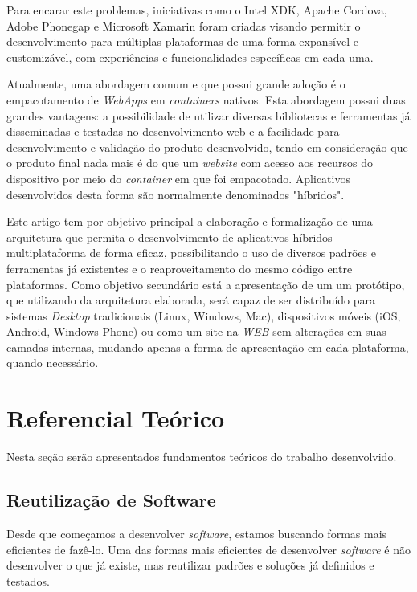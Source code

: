 Para encarar este problemas, iniciativas como o Intel XDK, Apache Cordova, Adobe Phonegap e Microsoft Xamarin foram criadas visando permitir o desenvolvimento para múltiplas plataformas de uma forma expansível e customizável, com experiências e funcionalidades específicas em cada uma. 

Atualmente, uma abordagem comum e que possui grande adoção é o empacotamento de \textit{WebApps} em \textit{containers} nativos. Esta abordagem possui duas grandes vantagens: a possibilidade de utilizar diversas bibliotecas e ferramentas já disseminadas e testadas no desenvolvimento web e a facilidade para desenvolvimento e validação do produto desenvolvido, tendo em consideração que o produto final nada mais é do que um \textit{website} com acesso aos recursos do dispositivo por meio do \textit{container} em que foi empacotado. Aplicativos desenvolvidos desta forma são normalmente denominados "híbridos".

Este artigo tem por objetivo principal a elaboração e formalização de uma arquitetura que permita o desenvolvimento de aplicativos híbridos multiplataforma de forma eficaz, possibilitando o uso de diversos padrões e ferramentas já existentes e o reaproveitamento do mesmo código entre plataformas. Como objetivo secundário está a apresentação de um um protótipo, que utilizando da arquitetura elaborada, será capaz de ser distribuído para sistemas \textit{Desktop} tradicionais (Linux, Windows, Mac), dispositivos móveis (iOS, Android, Windows Phone) ou como um site na \textit{WEB} sem alterações em suas camadas internas, mudando apenas a forma de apresentação em cada plataforma, quando necessário.

\section{\esp Referencial Teórico}

Nesta seção serão apresentados fundamentos teóricos do trabalho desenvolvido.

\subsection{\esp Reutilização de Software}

Desde que começamos a desenvolver \textit{software}, estamos buscando formas mais eficientes de fazê-lo. Uma das formas mais eficientes de desenvolver \textit{software} é não desenvolver o que já existe, mas reutilizar padrões e soluções já definidos e testados. 


